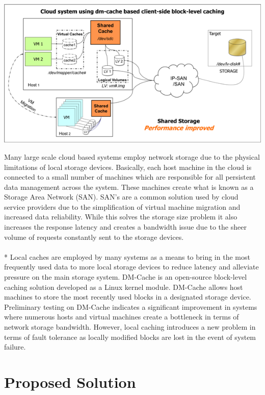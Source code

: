 \documentclass[letterpaper,12pt]{article}
\begin{document}
\begin{center}
  \includegraphics{../Images/NewerImage.png}
\end{center}
\noindent
Many large scale cloud based systems employ network storage due to the
physical limitations of local storage devices. Basically, each host
machine in the cloud is connected to a small number of machines which
are responsible for all persistent data management across the system.
These machines create what is known as a Storage Area Network (SAN).
SAN's are a common solution used by cloud service providers due to the
simplification of virtual machine migration and increased data
reliability. While this solves the storage size problem it also
increases the response latency and creates a bandwidth issue due to
the sheer volume of requests constantly sent to the storage devices.
\\ \\*
Local caches are employed by many systems as a means to bring in the
most frequently used data to more local storage devices to reduce
latency and alleviate pressure on the main storage system. DM-Cache is
an open-source block-level caching solution developed as a Linux
kernel module. DM-Cache allows host machines to store the most
recently used blocks in a designated storage device. Preliminary
testing on DM-Cache indicates a significant improvement in systems
where numerous hosts and virtual machines create a bottleneck in terms
of network storage bandwidth. However, local caching introduces a new
problem in terms of fault tolerance as locally modified blocks are lost
in the event of system failure.


\section*{Proposed Solution}
\end{document}
